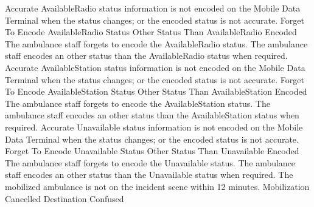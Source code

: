 	 {Accurate AvailableRadio status information is not encoded on the Mobile Data Terminal when the status changes; or the encoded status is not accurate.}
	 {Forget To Encode AvailableRadio Status}
	 {Other Status Than AvailableRadio Encoded}
\stopkaosspec
\startkaosspec
	 {The ambulance staff forgets to encode the AvailableRadio status.}
\stopkaosspec
\startkaosspec
	 {The ambulance staff encodes an other status than the AvailableRadio status when required.}
\stopkaosspec
\startkaosspec
	 {Accurate AvailableStation status information is not encoded on the Mobile Data Terminal when the status changes; or the encoded status is not accurate.}
	 {Forget To Encode AvailableStation Status}
	 {Other Status Than AvailableStation Encoded}
\stopkaosspec
\startkaosspec
	 {The ambulance staff forgets to encode the AvailableStation status.}
\stopkaosspec
\startkaosspec
	 {The ambulance staff encodes an other status than the AvailableStation status when required.}
\stopkaosspec
\startkaosspec
	 {Accurate Unavailable status information is not encoded on the Mobile Data Terminal when the status changes; or the encoded status is not accurate.}
	 {Forget To Encode Unavailable Status}
	 {Other Status Than Unavailable Encoded}
\stopkaosspec
\startkaosspec
	 {The ambulance staff forgets to encode the Unavailable status.}
\stopkaosspec
\startkaosspec
	 {The ambulance staff encodes an other status than the Unavailable status when required.}
\stopkaosspec
\startkaosspec
	 {The mobilized ambulance is not on the incident scene within 12 minutes.}
	 {Mobilization Cancelled}
	 {Destination Confused}
